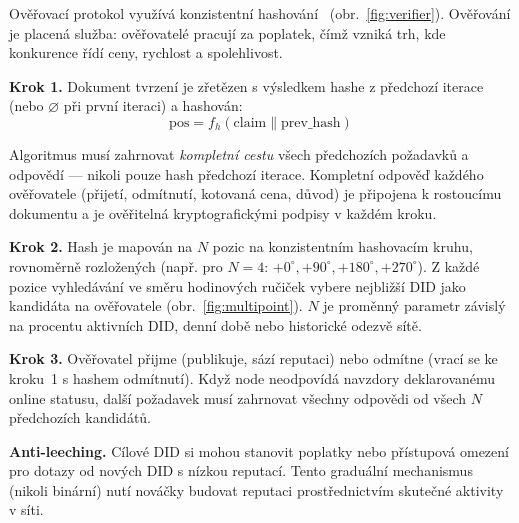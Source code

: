 \documentclass[11pt,a4paper,twocolumn]{article}
\begin{document}
Ověřovací protokol využívá konzistentní hashování~\cite{karger1997} (obr.~\ref{fig:verifier}). Ověřování je placená služba: ověřovatelé pracují za poplatek, čímž vzniká trh, kde konkurence řídí ceny, rychlost a spolehlivost.

\textbf{Krok 1.} Dokument tvrzení je zřetězen s výsledkem hashe z předchozí iterace (nebo $\varnothing$ při první iteraci) a hashován:
\begin{equation}
\text{pos} = f_h(\text{claim} \| \text{prev\_hash})
\label{eq:hash}
\end{equation}

Algoritmus musí zahrnovat \emph{kompletní cestu} všech předchozích požadavků a odpovědí --- nikoli pouze hash předchozí iterace. Kompletní odpověď každého ověřovatele (přijetí, odmítnutí, kotovaná cena, důvod) je připojena k rostoucímu dokumentu a je ověřitelná kryptografickými podpisy v každém kroku.

\textbf{Krok 2.} Hash je mapován na $N$ pozic na konzistentním hashovacím kruhu, rovnoměrně rozložených (např. pro $N=4$: $+0^{\circ}, +90^{\circ}, +180^{\circ}, +270^{\circ}$). Z každé pozice vyhledávání ve směru hodinových ručiček vybere nejbližší DID jako kandidáta na ověřovatele (obr.~\ref{fig:multipoint}). $N$ je proměnný parametr závislý na procentu aktivních DID, denní době nebo historické odezvě sítě.

\textbf{Krok 3.} Ověřovatel přijme (publikuje, sází reputaci) nebo odmítne (vrací se ke kroku~1 s hashem odmítnutí). Když node neodpovídá navzdory deklarovanému online statusu, další požadavek musí zahrnovat všechny odpovědi od všech $N$ předchozích kandidátů.

\textbf{Anti-leeching.} Cílové DID si mohou stanovit poplatky nebo přístupová omezení pro dotazy od nových DID s nízkou reputací. Tento graduální mechanismus (nikoli binární) nutí nováčky budovat reputaci prostřednictvím skutečné aktivity v síti.
\end{document}
